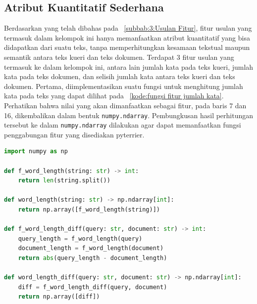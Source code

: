 \subsection{Atribut Kuantitatif Sederhana}
\label{subbab:4:Ekstraksi Fitur:Atribut Kuantitatif Sederhana}

Berdasarkan yang telah dibahas pada \subbab{}~\ref{subbab:3:Usulan Fitur}, fitur usulan yang termasuk dalam kelompok ini hanya memanfaatkan atribut kuantitatif yang bisa didapatkan dari suatu teks, tanpa memperhitungkan kesamaan tekstual maupun semantik antara teks kueri dan teks dokumen. Terdapat 3 fitur usulan yang termasuk ke dalam kelompok ini, antara lain jumlah kata pada teks kueri, jumlah kata pada teks dokumen, dan selisih jumlah kata antara teks kueri dan teks dokumen. Pertama, diimplementasikan suatu fungsi untuk menghitung jumlah kata pada teks yang dapat dilihat pada \kode{}~\ref{kode:fungsi fitur jumlah kata}. Perhatikan bahwa nilai yang akan dimanfaatkan sebagai fitur, pada baris 7 dan 16, dikembalikan dalam bentuk \lstinline{numpy.ndarray}. Pembungkusan hasil perhitungan tersebut ke dalam \lstinline{numpy.ndarray} dilakukan agar dapat memanfaatkan fungsi penggabungan fitur yang disediakan pyterrier.


\begin{lstlisting}[language=Python, caption={Fungsi fitur jumlah kata}, label={kode:fungsi fitur jumlah kata}]
import numpy as np

def f_word_length(string: str) -> int:
    return len(string.split())

def word_length(string: str) -> np.ndarray[int]:
    return np.array([f_word_length(string)])

def f_word_length_diff(query: str, document: str) -> int:
    query_length = f_word_length(query)
    document_length = f_word_length(document)
    return abs(query_length - document_length)

def word_length_diff(query: str, document: str) -> np.ndarray[int]:
    diff = f_word_length_diff(query, document)
    return np.array([diff])
\end{lstlisting}

